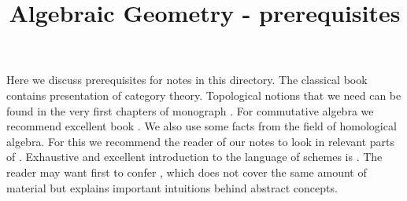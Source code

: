 



\title{Algebraic Geometry - prerequisites}
\date{}
\maketitle
\noindent
Here we discuss prerequisites for notes in this directory. The classical book \cite{Maclane} contains presentation of category theory. Topological notions that we need can be found in the very first chapters of monograph \cite{engelking1989general}. For commutative algebra we recommend excellent book \cite{AtiyahMacdonald}. We also use some facts from the field of homological algebra. For this we recommend the reader of our notes to look in relevant parts of \cite{weibel1995introduction}. Exhaustive and excellent introduction to the language of schemes is \cite{EGA1new}. The reader may want first to confer \cite{eisenbud2000geometryofschemes}, which does not cover the same amount of material but explains important intuitions behind abstract concepts.

\small


